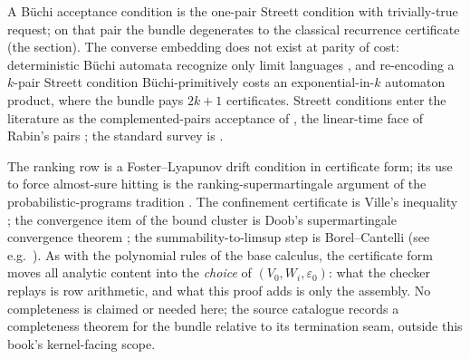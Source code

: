 \begin{bremark}
A B\"uchi acceptance condition is the one-pair Streett condition with
trivially-true request; on that pair the bundle degenerates to the
classical recurrence certificate (the 
section). The converse embedding does not exist at parity of cost:
deterministic B\"uchi automata recognize only limit languages
\cite{landweber1969}, and re-encoding a $k$-pair Streett condition
B\"uchi-primitively costs an exponential-in-$k$ automaton product, where
the bundle pays $2k + 1$ certificates. Streett conditions enter the
literature as the complemented-pairs acceptance of \cite{streett1982},
the linear-time face of Rabin's pairs \cite{rabin1969}; the standard
survey is \cite{thomas1990}.
\end{bremark}

\begin{bremark}
The ranking row is a Foster--Lyapunov drift condition
\cite{foster1953,meyntweedie1993} in certificate form; its use to force
almost-sure hitting is the ranking-supermartingale argument of the
probabilistic-programs tradition \cite{chakarov2013}. The confinement
certificate is Ville's inequality \cite{ville1939}; the convergence item
of the bound cluster is Doob's supermartingale convergence theorem
\cite{doob1953}; the summability-to-limsup step is Borel--Cantelli (see
e.g.\ \cite[Thm.~2.3.1]{durrett2019}). As with the polynomial rules of
the base calculus, the certificate form moves all analytic content into
the \emph{choice} of $(V_0, W_i, \varepsilon_0)$: what the checker
replays is row arithmetic, and what this proof adds is only the
assembly. No completeness is claimed or needed here; the source
catalogue records a completeness theorem for the bundle relative to its
termination seam, outside this book's kernel-facing scope.
\end{bremark}

